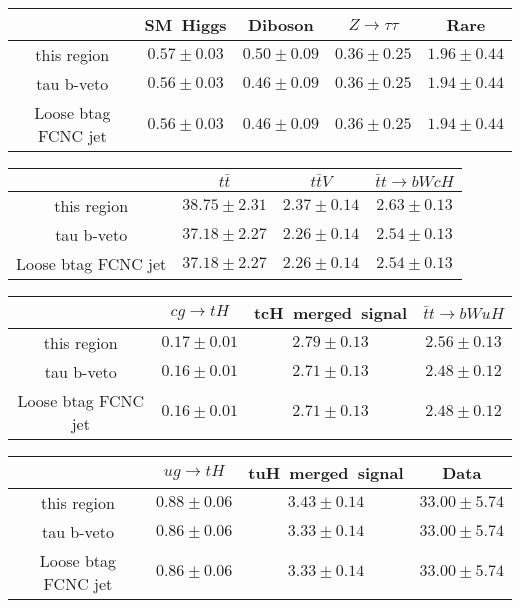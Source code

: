 \centering
\begin{tabular}{|c|c|c|c|c|} \hline
 & SM~Higgs & Diboson & $Z\to \tau\tau$ & Rare\\\hline
this region & $0.57\pm0.03$ & $0.50\pm0.09$ & $0.36\pm0.25$ & $1.96\pm0.44$\\\hline
tau b-veto & $0.56\pm0.03$ & $0.46\pm0.09$ & $0.36\pm0.25$ & $1.94\pm0.44$\\\hline
Loose btag FCNC jet & $0.56\pm0.03$ & $0.46\pm0.09$ & $0.36\pm0.25$ & $1.94\pm0.44$\\\hline
\end{tabular}
\begin{tabular}{|c|c|c|c|} \hline
 & $t\bar{t}$ & $t\bar{t}V$ & $\bar{t}t\to bWcH$\\\hline
this region & $38.75\pm2.31$ & $2.37\pm0.14$ & $2.63\pm0.13$\\\hline
tau b-veto & $37.18\pm2.27$ & $2.26\pm0.14$ & $2.54\pm0.13$\\\hline
Loose btag FCNC jet & $37.18\pm2.27$ & $2.26\pm0.14$ & $2.54\pm0.13$\\\hline
\end{tabular}
\begin{tabular}{|c|c|c|c|} \hline
 & $cg\to tH$ & tcH~merged~signal & $\bar{t}t\to bWuH$\\\hline
this region & $0.17\pm0.01$ & $2.79\pm0.13$ & $2.56\pm0.13$\\\hline
tau b-veto & $0.16\pm0.01$ & $2.71\pm0.13$ & $2.48\pm0.12$\\\hline
Loose btag FCNC jet & $0.16\pm0.01$ & $2.71\pm0.13$ & $2.48\pm0.12$\\\hline
\end{tabular}
\begin{tabular}{|c|c|c|c|} \hline
 & $ug\to tH$ & tuH~merged~signal & Data\\\hline
this region & $0.88\pm0.06$ & $3.43\pm0.14$ & $33.00\pm5.74$\\\hline
tau b-veto & $0.86\pm0.06$ & $3.33\pm0.14$ & $33.00\pm5.74$\\\hline
Loose btag FCNC jet & $0.86\pm0.06$ & $3.33\pm0.14$ & $33.00\pm5.74$\\\hline
\end{tabular}
